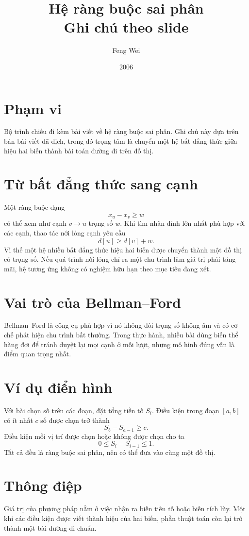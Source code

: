 \documentclass[11pt]{article}
\title{Hệ ràng buộc sai phân\\{\large Ghi chú theo slide}}
\author{Feng Wei}
\date{2006}
\begin{document}
\maketitle


\section{Phạm vi}

Bộ trình chiếu đi kèm bài viết về hệ ràng buộc sai phân. Ghi chú này dựa trên
bản bài viết đã dịch, trong đó trọng tâm là chuyển một hệ bất đẳng thức giữa
hiệu hai biến thành bài toán đường đi trên đồ thị.

\section{Từ bất đẳng thức sang cạnh}

Một ràng buộc dạng
\[
  x_u-x_v\ge w
\]
có thể xem như cạnh \(v\to u\) trọng số \(w\). Khi tìm nhãn đỉnh lớn nhất phù
hợp với các cạnh, thao tác nới lỏng cạnh yêu cầu
\[
  d[u]\ge d[v]+w.
\]
Vì thế một hệ nhiều bất đẳng thức hiệu hai biến được chuyển thành một đồ thị
có trọng số. Nếu quá trình nới lỏng chỉ ra một chu trình làm giá trị phải tăng
mãi, hệ tương ứng không có nghiệm hữu hạn theo mục tiêu đang xét.

\section{Vai trò của Bellman--Ford}

Bellman--Ford là công cụ phù hợp vì nó không đòi trọng số không âm và có cơ
chế phát hiện chu trình bất thường. Trong thực hành, nhiều bài dùng biến thể
hàng đợi để tránh duyệt lại mọi cạnh ở mỗi lượt, nhưng mô hình đúng vẫn là
điểm quan trọng nhất.

\section{Ví dụ điển hình}

Với bài chọn số trên các đoạn, đặt tổng tiền tố \(S_i\). Điều kiện trong đoạn
\([a,b]\) có ít nhất \(c\) số được chọn trở thành
\[
  S_b-S_{a-1}\ge c.
\]
Điều kiện mỗi vị trí được chọn hoặc không được chọn cho ta
\[
  0\le S_i-S_{i-1}\le 1.
\]
Tất cả đều là ràng buộc sai phân, nên có thể đưa vào cùng một đồ thị.

\section{Thông điệp}

Giá trị của phương pháp nằm ở việc nhận ra biến tiền tố hoặc biến tích lũy.
Một khi các điều kiện được viết thành hiệu của hai biến, phần thuật toán còn
lại trở thành một bài đường đi chuẩn.
\end{document}
